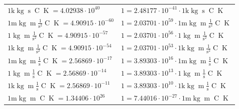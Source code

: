 \begin{center}
\begin{longtable}{l l}
{\color{gray}$1 \bm{\mathrm{ k}}\operatorname{kg}{}{\operatorname{s}}{\operatorname{C}}{\operatorname{K}} = 4.02938\cdot10^{40} $}   & {\color{gray}$ 1 = 2.48177\cdot10^{-41} \cdot 1 \bm{\mathrm{ k}}\operatorname{kg}{}{\operatorname{s}}{\operatorname{C}}{\operatorname{K}}$}  \\
{\color{gray}$1 \bm{\mathrm{ m}}\operatorname{kg}{\operatorname{m}}\frac1{\operatorname{s}^2}{\operatorname{C}}{\operatorname{K}} = 4.90915\cdot10^{-60} $}   & {\color{gray}$ 1 = 2.03701\cdot10^{59} \cdot 1 \bm{\mathrm{ m}}\operatorname{kg}{\operatorname{m}}\frac1{\operatorname{s}^2}{\operatorname{C}}{\operatorname{K}}$}  \\
{\color{black}$1 \bm{\mathrm{ }}\operatorname{kg}{\operatorname{m}}\frac1{\operatorname{s}^2}{\operatorname{C}}{\operatorname{K}} = 4.90915\cdot10^{-57} $}   & {\color{black}$ 1 = 2.03701\cdot10^{56} \cdot 1 \bm{\mathrm{ }}\operatorname{kg}{\operatorname{m}}\frac1{\operatorname{s}^2}{\operatorname{C}}{\operatorname{K}}$}  \\
{\color{gray}$1 \bm{\mathrm{ k}}\operatorname{kg}{\operatorname{m}}\frac1{\operatorname{s}^2}{\operatorname{C}}{\operatorname{K}} = 4.90915\cdot10^{-54} $}   & {\color{gray}$ 1 = 2.03701\cdot10^{53} \cdot 1 \bm{\mathrm{ k}}\operatorname{kg}{\operatorname{m}}\frac1{\operatorname{s}^2}{\operatorname{C}}{\operatorname{K}}$}  \\
{\color{gray}$1 \bm{\mathrm{ m}}\operatorname{kg}{\operatorname{m}}\frac1{\operatorname{s}}{\operatorname{C}}{\operatorname{K}} = 2.56869\cdot10^{-17} $}   & {\color{gray}$ 1 = 3.89303\cdot10^{16} \cdot 1 \bm{\mathrm{ m}}\operatorname{kg}{\operatorname{m}}\frac1{\operatorname{s}}{\operatorname{C}}{\operatorname{K}}$}  \\
{\color{black}$1 \bm{\mathrm{ }}\operatorname{kg}{\operatorname{m}}\frac1{\operatorname{s}}{\operatorname{C}}{\operatorname{K}} = 2.56869\cdot10^{-14} $}   & {\color{black}$ 1 = 3.89303\cdot10^{13} \cdot 1 \bm{\mathrm{ }}\operatorname{kg}{\operatorname{m}}\frac1{\operatorname{s}}{\operatorname{C}}{\operatorname{K}}$}  \\
{\color{gray}$1 \bm{\mathrm{ k}}\operatorname{kg}{\operatorname{m}}\frac1{\operatorname{s}}{\operatorname{C}}{\operatorname{K}} = 2.56869\cdot10^{-11} $}   & {\color{gray}$ 1 = 3.89303\cdot10^{10} \cdot 1 \bm{\mathrm{ k}}\operatorname{kg}{\operatorname{m}}\frac1{\operatorname{s}}{\operatorname{C}}{\operatorname{K}}$}  \\
{\color{gray}$1 \bm{\mathrm{ m}}\operatorname{kg}{\operatorname{m}}{}{\operatorname{C}}{\operatorname{K}} = 1.34406\cdot10^{26} $}   & {\color{gray}$ 1 = 7.44016\cdot10^{-27} \cdot 1 \bm{\mathrm{ m}}\operatorname{kg}{\operatorname{m}}{}{\operatorname{C}}{\operatorname{K}}$}  \\

\end{longtable}
\end{center}
